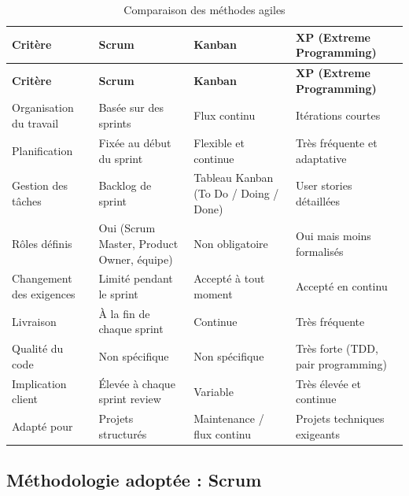 \begin{longtable}{|p{4cm}|p{4cm}|p{4cm}|p{4cm}|}

\caption{Comparaison des méthodes agiles\cite{agile_comparatif_artza}}
\label{tab:comparaisonAgile} \\
\hline

\rowcolor{coloranihub}
\textbf{Critère} & \textbf{Scrum} & \textbf{Kanban} & \textbf{XP (Extreme Programming)} \\
\hline
\endfirsthead

\hline
\rowcolor{coloranihub}
\textbf{Critère} & \textbf{Scrum} & \textbf{Kanban} & \textbf{XP (Extreme Programming)} \\
\hline
\endhead

Organisation du travail & Basée sur des sprints & Flux continu & Itérations courtes \\
\hline

Planification & Fixée au début du sprint & Flexible et continue & Très fréquente et adaptative \\
\hline

Gestion des tâches & Backlog de sprint & Tableau Kanban (To Do / Doing / Done) & User stories détaillées \\
\hline

Rôles définis & Oui (Scrum Master, Product Owner, équipe) & Non obligatoire & Oui mais moins formalisés \\
\hline

Changement des exigences & Limité pendant le sprint & Accepté à tout moment & Accepté en continu \\
\hline

Livraison & À la fin de chaque sprint & Continue & Très fréquente \\
\hline

Qualité du code & Non spécifique & Non spécifique & Très forte (TDD, pair programming) \\
\hline

Implication client & Élevée à chaque sprint review & Variable & Très élevée et continue \\
\hline

Adapté pour & Projets structurés & Maintenance / flux continu & Projets techniques exigeants \\
\hline

\end{longtable}

\subsection{Méthodologie adoptée : Scrum}

